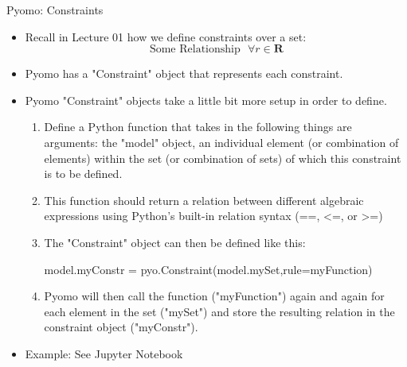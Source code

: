 \documentclass[10pt, aspectratio=169]{beamer}
\begin{document}
\begin{frame}{Pyomo: Constraints}
    \begin{itemize}
        \item Recall in Lecture 01 how we define constraints over a set:
        $$\text{Some\ Relationship} \ \ \ \forall r \in \textbf{R}$$
        \item Pyomo has a "Constraint" object that represents each constraint.
        \item Pyomo "Constraint" objects take a little bit more setup in order to define.
        \begin{enumerate}
            \item Define a Python function that takes in the following things are arguments: the "model" object, an individual element (or combination of elements) within the set (or combination of sets) of which this constraint is to be defined.
            \item This function should return a relation between different algebraic expressions using Python's built-in relation syntax (==, \textless=, or \textgreater=)
            \item The "Constraint" object can then be defined like this:
            
            \hspace{0.25cm} model.myConstr = pyo.Constraint(model.mySet,rule=myFunction)

            \item Pyomo will then call the function ("myFunction") again and again for each element in the set ("mySet") and store the resulting relation in the constraint object ("myConstr").
        \end{enumerate}
        \item Example: See Jupyter Notebook
    \end{itemize}
\end{frame}
\end{document}
